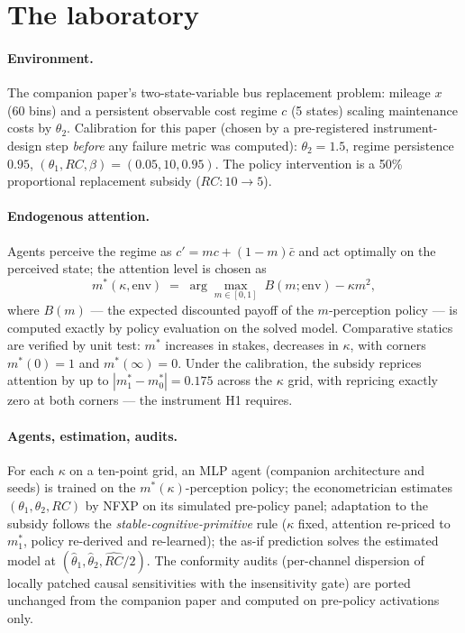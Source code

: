 \documentclass[11pt]{article}
\newcommand{\rhat}{\widehat{RC}}
\newcommand{\that}[1]{\widehat{\theta}_{#1}}
\newcommand{\mstar}{m^{*}}
\begin{document}
\section{The laboratory}\label{sec:lab}

\paragraph{Environment.} The companion paper's two-state-variable bus
replacement problem: mileage $x$ (60 bins) and a persistent observable cost
regime $c$ (5 states) scaling maintenance costs by $\theta_2$. Calibration
for this paper (chosen by a pre-registered instrument-design step
\emph{before} any failure metric was computed): $\theta_2 = 1.5$, regime
persistence $0.95$, $(\theta_1, RC, \beta) = (0.05, 10, 0.95)$. The policy
intervention is a 50\% proportional replacement subsidy ($RC\!: 10 \to 5$).

\paragraph{Endogenous attention.} Agents perceive the regime as
$c' = m c + (1 - m)\bar c$ and act optimally on the perceived state; the
attention level is chosen as
\[
\mstar(\kappa, \text{env}) \;=\; \arg\max_{m \in [0,1]}\;
B(m; \text{env}) - \kappa m^2,
\]
where $B(m)$ --- the expected discounted payoff of the $m$-perception
policy --- is computed exactly by policy evaluation on the solved model.
Comparative statics are verified by unit test: $\mstar$ increases in
stakes, decreases in $\kappa$, with corners $\mstar(0) = 1$ and
$\mstar(\infty) = 0$. Under the calibration, the subsidy reprices attention
by up to $|\mstar_1 - \mstar_0| = 0.175$ across the $\kappa$ grid, with
repricing exactly zero at both corners --- the instrument H1 requires.

\paragraph{Agents, estimation, audits.} For each $\kappa$ on a ten-point
grid, an MLP agent (companion architecture and seeds) is trained on the
$\mstar(\kappa)$-perception policy; the econometrician estimates
$(\theta_1, \theta_2, RC)$ by NFXP on its simulated pre-policy panel;
adaptation to the subsidy follows the \emph{stable-cognitive-primitive}
rule ($\kappa$ fixed, attention re-priced to $\mstar_1$, policy re-derived
and re-learned); the as-if prediction solves the estimated model at
$(\that{1}, \that{2}, \rhat/2)$. The conformity audits (per-channel
dispersion of locally patched causal sensitivities with the insensitivity
gate) are ported unchanged from the companion paper and computed on
pre-policy activations only.
\end{document}
